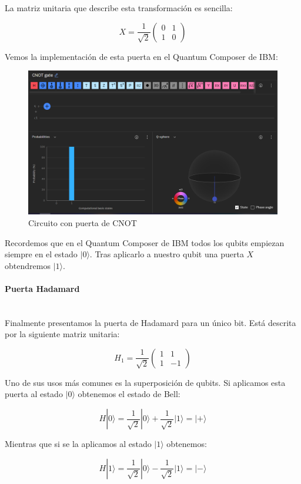 \documentclass[11pt]{article}
\newcommand{\ra}{\rangle}
\newcommand{\myparagraph}[1]{\paragraph*{#1}\mbox{}\\}
\begin{document}
La matriz unitaria que describe esta transformación es sencilla:

\[
X = \frac{1}{\sqrt 2}
\begin{pmatrix}
	0 & 1 \\
	1 & 0 
\end{pmatrix}
\]

Vemos la implementación de esta puerta en el Quantum Composer de IBM:

\begin{figure}[H]
	\centering
	\includegraphics[scale=0.5]{figures/gate-x.png}
	\caption{Circuito con puerta de CNOT}
\end{figure}

Recordemos que en el Quantum Composer de IBM todos los qubits empiezan siempre en el estado $|0\ra$. Tras aplicarlo a nuestro qubit una puerta $X$ obtendremos $|1\ra$. \\


\myparagraph{Puerta Hadamard}


Finalmente presentamos la puerta de Hadamard para un único bit. Está descrita por la siguiente matriz unitaria:

\[
	H_1 = \frac{1}{\sqrt 2}
	\begin{pmatrix}
		1 & 1 \\
		1 & -1 
	\end{pmatrix}
\]

Uno de sus usos más comunes es la superposición de qubits. Si aplicamos esta puerta al estado $|0\ra$ obtenemos el estado de Bell:

\[
	H|0\ra = \frac{1}{\sqrt 2} |0\ra + \frac{1}{\sqrt 2} |1\ra = |+\ra
\]

Mientras que si se la aplicamos al estado $|1\ra$ obtenemos:

\[
	H|1\ra = \frac{1}{\sqrt 2} |0\ra - \frac{1}{\sqrt 2} |1\ra = |-\ra
\]
\end{document}
